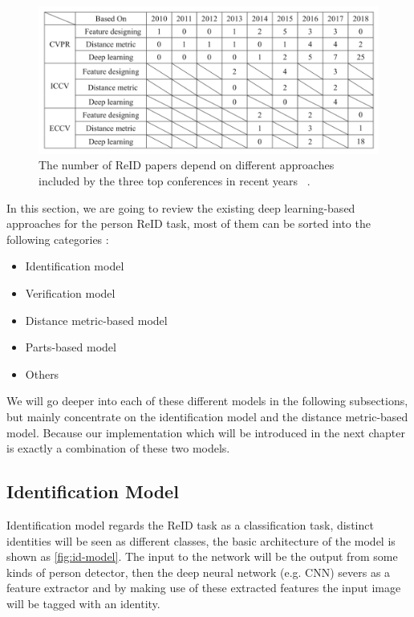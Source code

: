 \begin{figure}
    \includegraphics[width=\linewidth]{figures/papers_trend.png}
    \caption{The number of ReID papers depend on different approaches included
    by the three top conferences in recent years
    ~\protect\cite{survey-on-dl-for-reid-2019}.}
    \label{fig:papers-trend}
\end{figure}

In this section, we are going to review the existing deep learning-based 
approaches for the person ReID task, most of them can be sorted into the 
following categories \cite{survey-on-dl-for-reid-2019}:

\begin{itemize}
    \item Identification model
    \item Verification model
    \item Distance metric-based model
    \item Parts-based model
    \item Others
\end{itemize}

We will go deeper into each of these different models in the following
subsections, but mainly concentrate on the identification model and the
distance metric-based model. Because our implementation which will be
introduced in the next chapter is exactly a combination of these two models.

\subsection{Identification Model}
\label{sec:related-work-re-id-idm}

Identification model regards the ReID task as a classification task, distinct
identities will be seen as different classes, the basic architecture of the 
model is shown as \autoref{fig:id-model}. The input to the
network will be the output from some kinds of person detector, then the deep
neural network (e.g. CNN) severs as a feature extractor and by making use of 
these extracted features the input image will be tagged with an identity.

